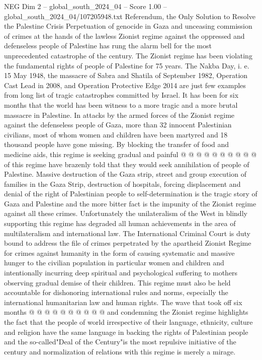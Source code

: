 \begin{textsample}{NEG Dim 2 – global\_south\_2024\_04 – Score 1.00 – global\_south\_2024\_04/107205948.txt}  \label{ex:f2_neg_394}
Referendum, the Only Solution to Resolve the Palestine Crisis Perpetuation of genocide in Gaza and unceasing commission of crimes at the hands of the lawless Zionist regime against the oppressed and defenseless people of Palestine has rung the alarm bell for the most unprecedented catastrophe of the century.
The Zionist regime has been violating the fundamental rights of people of Palestine for 75 years.
The Nakba Day, i. e. 15 May 1948, the massacre of Sabra and Shatila of September 1982, Operation Cast Lead in 2008, and Operation Protective Edge 2014 are just few examples from long list of tragic catastrophes committed by Israel.
It has been for six months that the world has been witness to a more tragic and a more brutal massacre in Palestine.
In attacks by the armed forces of the Zionist regime against the defenseless people of Gaza, more than 32 innocent Palestinian civilians, most of whom women and children have been martyred and 18 thousand people have gone missing.
By blocking the transfer of food and medicine aids, this regime is seeking gradual and painful @ @ @ @ @ @ @ @ @ @ of this regime have brazenly told that they would seek annihilation of people of Palestine.
Massive destruction of the Gaza strip, street and group execution of families in the Gaza Strip, destruction of hospitals, forcing displacement and denial of the right of Palestinian people to self-determination is the tragic story of Gaza and Palestine and the more bitter fact is the impunity of the Zionist regime against all these crimes.
Unfortunately the unilateralism of the West in blindly supporting this regime has degraded all human achievements in the area of multilateralism and international law.
The International Criminal Court is duty bound to address the file of crimes perpetrated by the apartheid Zionist Regime for crimes against humanity in the form of causing systematic and massive hunger to the civilian population in particular women and children and intentionally incurring deep spiritual and psychological suffering to mothers observing gradual demise of their children.
This regime must also be held accountable for dishonoring international rules and norms, especially the international humanitarian law and human rights.
The wave that took off six months @ @ @ @ @ @ @ @ @ @ and condemning the Zionist regime highlights the fact that the people of world irrespective of their language, ethnicity, culture and religion have the same language in backing the rights of Palestinian people and the so-called"Deal of the Century"is the most repulsive initiative of the century and normalization of relations with this regime is merely a mirage.

\end{textsample}
